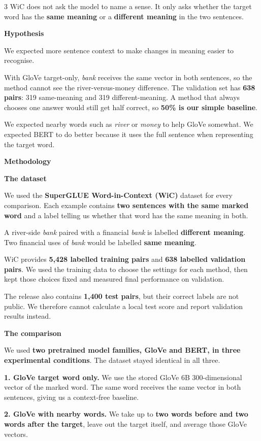 \documentclass{article}
\newcommand{\sectiontitle}[1]{%
  \Needspace{4\baselineskip}%
  \par\vspace{5mm}%
  {\fontsize{30}{35}\selectfont\bfseries\textcolor{trierblue}{#1}\par}%
  \vspace{6mm}%
}
\newcommand{\subsectiontitle}[1]{%
  \Needspace{3\baselineskip}%
  \par\vspace{4mm}%
  {\fontsize{25}{29}\selectfont\bfseries\textcolor{deepblue}{#1}\par}%
  \vspace{4mm}%
}
\begin{document}
\begin{multicols}{3}
WiC does not ask the model to name a sense. It only asks whether the target word has the \textbf{same meaning} or a \textbf{different meaning} in the two sentences.

\sectiontitle{Hypothesis}
We expected more sentence context to make changes in meaning easier to recognise.

\columnbreak
With GloVe target-only, \textit{bank} receives the same vector in both sentences, so the method cannot see the river-versus-money difference. The validation set has \textbf{638 pairs}: 319 same-meaning and 319 different-meaning. A method that always chooses one answer would still get half correct, so \textbf{50\% is our simple baseline}.

We expected nearby words such as \textit{river} or \textit{money} to help GloVe somewhat. We expected BERT to do better because it uses the full sentence when representing the target word.

\sectiontitle{Methodology}

\subsectiontitle{The dataset}
We used the \textbf{SuperGLUE Word-in-Context (WiC)} dataset for every comparison. Each example contains \textbf{two sentences with the same marked word} and a label telling us whether that word has the same meaning in both.

A river-side \textit{bank} paired with a financial \textit{bank} is labelled \textbf{different meaning}. Two financial uses of \textit{bank} would be labelled \textbf{same meaning}.

WiC provides \textbf{5,428 labelled training pairs} and \textbf{638 labelled validation pairs}. We used the training data to choose the settings for each method, then kept those choices fixed and measured final performance on validation.

The release also contains \textbf{1,400 test pairs}, but their correct labels are not public. We therefore cannot calculate a local test score and report validation results instead.

\subsectiontitle{The comparison}
We used \textbf{two pretrained model families, GloVe and BERT, in three experimental conditions}. The dataset stayed identical in all three.

\textbf{1. GloVe target word only.} We use the stored GloVe 6B 300-dimensional vector of the marked word. The same word receives the same vector in both sentences, giving us a context-free baseline.

\textbf{2. GloVe with nearby words.} We take up to \textbf{two words before and two words after the target}, leave out the target itself, and average those GloVe vectors.


\end{multicols}
\end{document}
